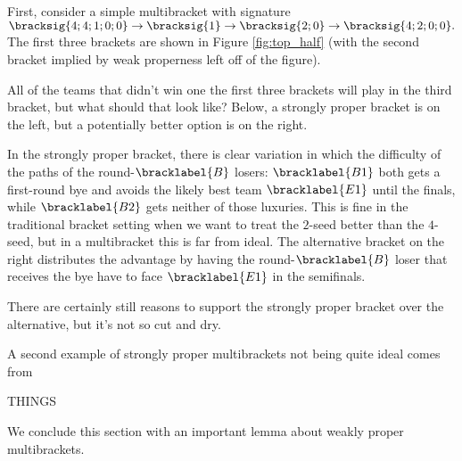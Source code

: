 {    First, consider a simple multibracket with signature $\bracksig{4;4;1;0;0} \to \bracksig{1} \to \bracksig{2;0} \to \bracksig{4;2;0;0}.$ The first three brackets are shown in Figure \ref{fig:top_half} (with the second bracket implied by weak properness left off of the figure).


    All of the teams that didn't win one the first three brackets will play in the third bracket, but what should that look like? Below, a strongly proper bracket is on the left, but a potentially better option is on the right.


    In the strongly proper bracket, there is clear variation in which the difficulty of the paths of the round-$\bracklabel{B}$ losers: $\bracklabel{B1}$ both gets a first-round bye and avoids the likely best team $\bracklabel{E1}$ until the finals, while $\bracklabel{B2}$ gets neither of those luxuries. This is fine in the traditional bracket setting when we want to treat the $2$-seed better than the $4$-seed, but in a multibracket this is far from ideal. The alternative bracket on the right distributes the advantage by having the round-$\bracklabel{B}$ loser that receives the bye have to face $\bracklabel{E1}$ in the semifinals.

    There are certainly still reasons to support the strongly proper bracket over the alternative, but it's not so cut and dry.

    A second example of strongly proper multibrackets not being quite ideal comes from 

    THINGS



    We conclude this section with an important lemma about weakly proper multibrackets.

    


}
